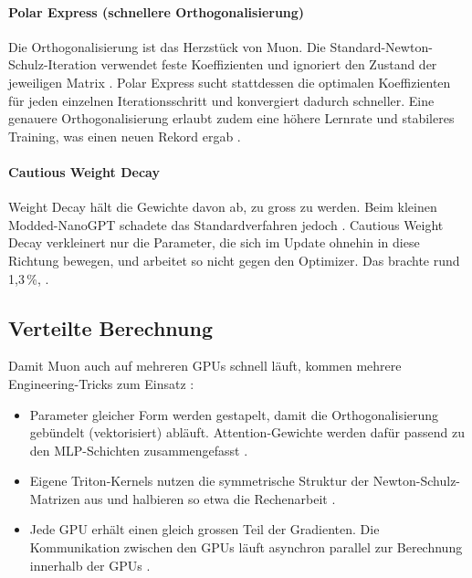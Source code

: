 \paragraph{Polar Express (schnellere Orthogonalisierung)}
Die Orthogonalisierung ist das Herzstück von Muon. Die Standard-Newton-Schulz-Iteration verwendet feste Koeffizienten und ignoriert den Zustand der jeweiligen Matrix \cite{srivastava_muon_2024}.
Polar Express sucht stattdessen die optimalen Koeffizienten für jeden einzelnen Iterationsschritt und konvergiert dadurch schneller. Eine genauere Orthogonalisierung erlaubt zudem eine höhere Lernrate und stabileres Training, was einen neuen Rekord ergab \cite{srivastava_muon_2024}.

\paragraph{Cautious Weight Decay}
Weight Decay hält die Gewichte davon ab, zu gross zu werden. Beim kleinen Modded-NanoGPT schadete das Standardverfahren jedoch \cite{srivastava_muon_2024}.
Cautious Weight Decay verkleinert nur die Parameter, die sich im Update ohnehin in diese Richtung bewegen, und arbeitet so nicht gegen den Optimizer. Das brachte rund 1,3\,\%, \cite{srivastava_muon_2024}.

\subsection*{Verteilte Berechnung}

Damit Muon auch auf mehreren GPUs schnell läuft, kommen mehrere Engineering-Tricks zum Einsatz \cite{srivastava_muon_2024}:
\begin{itemize}
    \item Parameter gleicher Form werden gestapelt, damit die Orthogonalisierung gebündelt (vektorisiert) abläuft. Attention-Gewichte werden dafür passend zu den MLP-Schichten zusammengefasst \cite{srivastava_muon_2024}.
    \item Eigene Triton-Kernels nutzen die symmetrische Struktur der Newton-Schulz-Matrizen aus und halbieren so etwa die Rechenarbeit \cite{srivastava_muon_2024}.
    \item Jede GPU erhält einen gleich grossen Teil der Gradienten. Die Kommunikation zwischen den GPUs läuft asynchron parallel zur Berechnung innerhalb der GPUs \cite{srivastava_muon_2024}.
\end{itemize}

